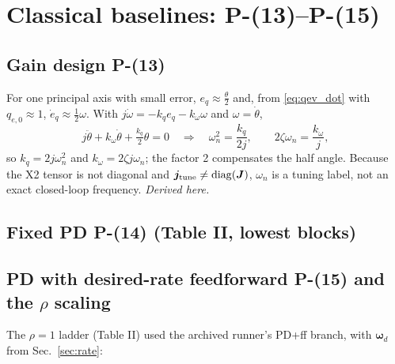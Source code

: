\documentclass[11pt]{article}
\newcommand{\srcroot}{../..}
\newcommand{\Peq}[1]{P-(#1)}
\theoremstyle{remark}
\newcommand{\listing}[4]{%
  \Needspace{8\baselineskip}%
  }
\begin{document}
\section{Classical baselines: \Peq{13}--\Peq{15}}
\subsection{Gain design \Peq{13}}
For one principal axis with small error, $e_q\approx\frac\theta2$ and, from \eqref{eq:qev_dot} with $q_{e,0}\approx1$,
$\dot e_q\approx\frac12\omega$. With $j\dot\omega=-k_qe_q-k_\omega\omega$ and $\omega=\dot\theta$,
\[
j\ddot\theta+k_\omega\dot\theta+\tfrac{k_q}{2}\theta=0\quad\Longrightarrow\quad
\omega_n^2=\frac{k_q}{2j},\qquad 2\zeta\omega_n=\frac{k_\omega}{j},
\]
so $k_q=2j\omega_n^2$ and $k_\omega=2\zeta j\omega_n$; the factor 2 compensates the half angle. Because the X2 tensor is not
diagonal and $\bm j_{\rm tune}\ne\operatorname{diag}(\bm J)$, $\omega_n$ is a tuning label, not an exact closed-loop frequency.
\emph{Derived here.}

\subsection{Fixed PD \Peq{14} (Table II, lowest blocks)}
\listing{experiments/nengo_nef_replication_2026-08-29/run_mujoco_nef.py}{163}{165}{$\bm\omega_n=(4,4,3.5)$, $\bm k_q$, $\bm k_\omega$ with $\zeta=0.95$}
\listing{experiments/nengo_nef_replication_2026-08-29/run_mujoco_nef.py}{226}{230}{\Peq{14} and the PES target \Peq{24}}

\subsection{PD with desired-rate feedforward \Peq{15} and the $\rho$ scaling}
The $\rho=1$ ladder (Table II) used the archived runner's PD+ff branch, with $\bm\omega_d$ from Sec.~\ref{sec:rate}:
\listing{experiments/nengo_nef_replication_2026-08-29/run_mujoco_nef_baselines.py}{463}{470}{\Peq{15} (integral gain zero in the paper's runs)}
\end{document}
